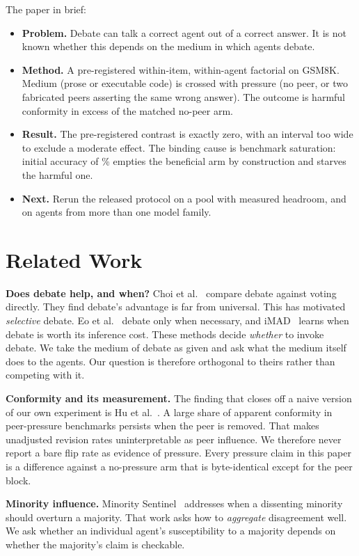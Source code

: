 \documentclass[conference]{IEEEtran}
\begin{document}
The paper in brief:

\begin{itemize}
\item \textbf{Problem.} Debate can talk a correct agent out of a correct answer. It
is not known whether this depends on the medium in which agents debate.
\item \textbf{Method.} A pre-registered within-item, within-agent factorial on
GSM8K. Medium (prose or executable code) is crossed with pressure (no peer, or two
fabricated peers asserting the same wrong answer). The outcome is harmful conformity
in excess of the matched no-peer arm.
\item \textbf{Result.} The pre-registered contrast is exactly zero, with an interval
too wide to exclude a moderate effect. The binding cause is benchmark saturation:
initial accuracy of \PoolGSMNLPct\% empties the beneficial arm by construction and
starves the harmful one.
\item \textbf{Next.} Rerun the released protocol on a pool with measured headroom,
and on agents from more than one model family.
\end{itemize}

\section{Related Work}

\textbf{Does debate help, and when?} Choi et al.~\cite{choi2025debatevote} compare
debate against voting directly. They find debate's advantage is far from universal.
This has motivated \emph{selective} debate. Eo et al.~\cite{minority2025} debate only
when necessary, and iMAD~\cite{imad2025} learns when debate is worth its inference
cost. These methods decide \emph{whether} to invoke debate. We take the medium of
debate as given and ask what the medium itself does to the agents. Our question is
therefore orthogonal to theirs rather than competing with it.

\textbf{Conformity and its measurement.} The finding that closes off a naive version
of our own experiment is Hu et al.~\cite{speaker2026}. A large share of apparent
conformity in peer-pressure benchmarks persists when the peer is removed. That makes
unadjusted revision rates uninterpretable as peer influence. We therefore never
report a bare flip rate as evidence of pressure. Every pressure claim in this paper
is a difference against a no-pressure arm that is byte-identical except for the peer
block.

\textbf{Minority influence.} Minority Sentinel~\cite{sentinel2026} addresses when a
dissenting minority should overturn a majority. That work asks how to
\emph{aggregate} disagreement well. We ask whether an individual agent's
susceptibility to a majority depends on whether the majority's claim is checkable.
\end{document}
